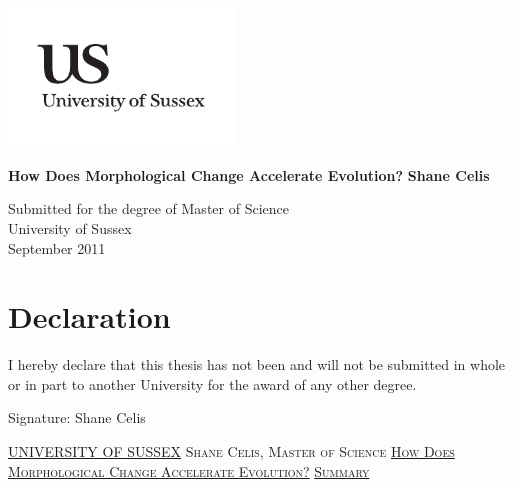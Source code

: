 \documentclass[a4paper,11pt]{report}
\newcommand{\linespacing}{1.5}
\renewcommand{\baselinestretch}{\linespacing}
\begin{document}




\thispagestyle{empty}
\begin{flushright}
\includegraphics[width=6cm]{fig/uslogo.pdf}
\end{flushright}	
\vskip40mm
\begin{center}
\huge\textbf{How Does Morphological Change Accelerate Evolution?}
\vskip2mm
\LARGE\textit{}
\vskip5mm
\Large\textbf{Shane Celis}
\normalsize
\end{center}
\vfill
\begin{flushleft}
\large
Submitted for the degree of Master of Science \\
University of Sussex	\\
September 2011
\end{flushleft}		


\chapter*{Declaration}
I hereby declare that this thesis has not been and will not be submitted in whole or in part to another University for the award of any other degree.
	

\vskip5mm
Signature:
\vskip20mm
Shane Celis


\thispagestyle{empty}
\newpage
\null\vskip10mm
\begin{center}
\large
\underline{UNIVERSITY OF SUSSEX}
\vskip20mm
\textsc{Shane Celis, Master of Science}
\vskip20mm
\underline{\textsc{How Does Morphological Change Accelerate Evolution?}}
\vskip0mm
\underline{\textsc{}}
\vskip20mm
\underline{\textsc{Summary}}
\vskip2mm
\end{center}
\renewcommand{\baselinestretch}{1.0}
\small\normalsize
\end{document}
